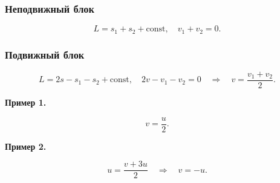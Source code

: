 \documentclass[12pt, a4paper]{article}
\begin{document}
\subsubsection*{Неподвижный блок}

\[
L = s_1 + s_2 + \mathrm{const}, \quad v_1 + v_2 = 0.
\]

\subsubsection*{Подвижный блок}

\[
L = 2s - s_1 - s_2 + \mathrm{const}, \quad 2v - v_1 - v_2 = 0 \quad \Longrightarrow \quad v = \frac{v_1 + v_2}{2}.
\]

\textbf{Пример 1.}

\[
v = \frac{u}{2}.
\]

\textbf{Пример 2.}

\[
u = \frac{v + 3u}{2} \quad \Longrightarrow \quad v = -u.
\]
\end{document}
